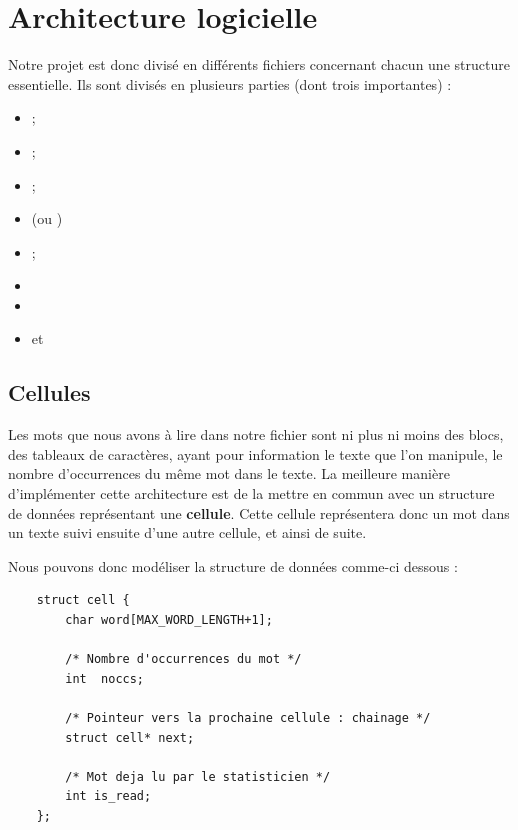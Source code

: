 \documentclass{article}
\begin{document}
\section{Architecture logicielle}
\label{sct:archi_logicielle}

Notre projet est donc divisé en différents fichiers concernant chacun une structure essentielle. Ils sont divisés en plusieurs parties (dont trois importantes) :
\begin{itemize}
    \item {} ; 
    \item {} ; 
    \item {} ; 
    \item {} (ou )
    \item {} ; 
    \item {}
    \item {}
    \item {} et 
\end{itemize}


\subsection{Cellules}
\label{subsct:cellules}

Les mots que nous avons à lire dans notre fichier sont ni plus ni moins des blocs, des tableaux de caractères, ayant pour information le texte que l'on manipule, le nombre d'occurrences du même mot dans le texte. La meilleure manière d'implémenter cette architecture est de la mettre en commun avec un structure de données représentant une \textbf{cellule}. Cette cellule représentera donc un mot dans un texte suivi ensuite d'une autre cellule, et ainsi de suite.

Nous pouvons donc modéliser la structure de données comme-ci dessous :
\begin{lstlisting}
    struct cell {
        char word[MAX_WORD_LENGTH+1];
        
        /* Nombre d'occurrences du mot */
        int  noccs;
        
        /* Pointeur vers la prochaine cellule : chainage */
        struct cell* next;
        
        /* Mot deja lu par le statisticien */
        int is_read;
    };
\end{lstlisting}
\label{lst:struct_cell_base}
\end{document}
